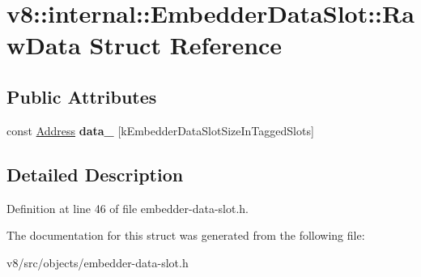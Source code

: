 \hypertarget{structv8_1_1internal_1_1EmbedderDataSlot_1_1RawData}{}\section{v8\+:\+:internal\+:\+:Embedder\+Data\+Slot\+:\+:Raw\+Data Struct Reference}
\label{structv8_1_1internal_1_1EmbedderDataSlot_1_1RawData}
\subsection*{Public Attributes}
\begin{DoxyCompactItemize}
\item 
\mbox{\label{structv8_1_1internal_1_1EmbedderDataSlot_1_1RawData_a9ea09b30cf32bbf0c64e94d196931404}} 
const \mbox{\hyperlink{classuintptr__t}{Address}} {\bfseries data\+\_\+} \mbox{[}k\+Embedder\+Data\+Slot\+Size\+In\+Tagged\+Slots\mbox{]}
\end{DoxyCompactItemize}


\subsection{Detailed Description}


Definition at line 46 of file embedder-\/data-\/slot.\+h.



The documentation for this struct was generated from the following file\+:\begin{DoxyCompactItemize}
\item 
v8/src/objects/embedder-\/data-\/slot.\+h\end{DoxyCompactItemize}
